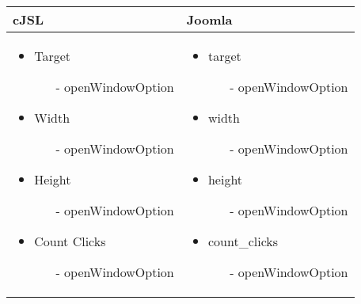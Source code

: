 \begin{minipage}{0.7\textwidth}
\begin{tabular}{|p{} | p{}|}
\hline
\textbf{cJSL} & \textbf{Joomla} \\ 
\hline
\begin{itemize}
\item Target
	   \begin{enumerate}
	     \item[-] openWindowOption
	   \end{enumerate}
\item Width
	\begin{enumerate}
		\item[-] openWindowOption
	  \end{enumerate}
\item Height
	\begin{enumerate}
		\item[-] openWindowOption
	   \end{enumerate}
\item Count Clicks
	\begin{enumerate}
		\item[-] openWindowOption
	   \end{enumerate}
\end{itemize}
 & 
\begin{itemize}
\item target
		\begin{enumerate}
			\item[-] openWindowOption
	   \end{enumerate}
\item width
		\begin{enumerate}
			\item[-] openWindowOption
	   \end{enumerate}
\item height
		\begin{enumerate}
			\item[-] openWindowOption
	   \end{enumerate}
\item count\_clicks
		\begin{enumerate}
			\item[-] openWindowOption
	   \end{enumerate}
\end{itemize}
\\
\hline
\end{tabular}
\end{minipage}

